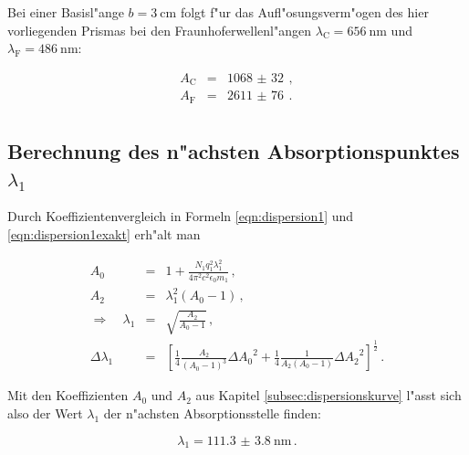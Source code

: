 		\clearpage

		Bei einer Basisl"ange $b = \SI{3}{\centi \meter}$ folgt f"ur das Aufl"osungsverm"ogen des hier vorliegenden Prismas bei den Fraunhoferwellenl"angen $\lambda_\mathrm{C} = \SI{656}{\nano \meter}$ und $\lambda_\mathrm{F} = \SI{486}{\nano \meter}$:

		\begin{eqnarray*}
			A_\mathrm{C} & = & \SI{1068(32)}{} \,, \\
			A_\mathrm{F} & = & \SI{2611(76)}{} \,. \\
		\end{eqnarray*}

	\subsection{Berechnung des n"achsten Absorptionspunktes $\lambda_\mathrm{1}$}
	\label{subsec:absorptionspunkt}
		Durch Koeffizientenvergleich in Formeln \eqref{eqn:dispersion1} und \eqref{eqn:dispersion1exakt} erh"alt man

		\begin{eqnarray*}
			A_0 & = & 1 + \frac{N_1 q_1^2 \lambda_1^2}{4 \pi^2 c^2 \epsilon_0 m_1} \,, \\
			A_2 & = & \lambda_1^2 (A_0 - 1) \,, \\
			\Rightarrow \quad \lambda_1 & = & \sqrt{\frac{A_2}{A_0 - 1}} \,, \\
			\Delta \lambda_1 & = & \left[\frac{1}{4}\frac{A_2}{(A_0 - 1)^3} \Delta {A_0}^2 + \frac{1}{4}\frac{1}{A_2 (A_0 - 1)} \Delta {A_2}^2\right]^\frac{1}{2} \,.
		\end{eqnarray*}

		Mit den Koeffizienten $A_0$ und $A_2$ aus Kapitel \ref{subsec:dispersionskurve} l"asst sich also der Wert $\lambda_1$ der n"achsten Absorptionsstelle finden:

		\begin{equation*}
			\lambda_1 = \SI{111.3(38)}{\nano \meter} \,.
		\end{equation*}
